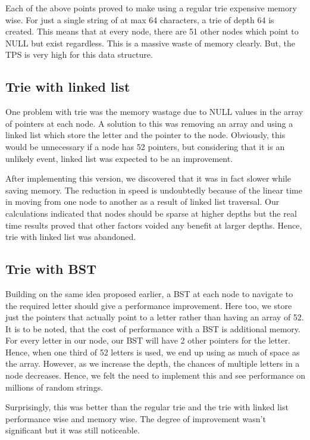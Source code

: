 \documentclass{article}
\begin{document}
Each of the above points proved to make using a regular trie expensive memory wise. For just a single string of at max 64 characters, a trie of depth 64 is created. This means that at every node, there are 51 other nodes which point to NULL but exist regardless. This is a massive waste of memory clearly. But, the TPS is very high for this data structure.

\subsection{Trie with linked list}

One problem with trie was the memory wastage due to NULL values in the array of pointers at each node. A solution to this was removing an array and using a linked list which store the letter and the pointer to the node. Obviously, this would be unnecessary if a node has 52 pointers, but considering that it is an unlikely event, linked list was expected to be an improvement. 

After implementing this version, we discovered that it was in fact slower while saving memory. The reduction in speed is undoubtedly because of the linear time in moving from one node to another as a result of linked list traversal. Our calculations indicated that nodes should be sparse at higher depths but the real time results proved that other factors voided any benefit at larger depths. Hence, trie with linked list was abandoned.

\subsection{Trie with BST}

Building on the same idea proposed earlier, a BST at each node to navigate to the required letter should give a performance improvement. Here too, we store just the pointers that actually point to a letter rather than having an array of 52. It is to be noted, that the cost of performance with a BST is additional memory. For every letter in our node, our BST will have 2 other pointers for the letter. Hence, when one third of 52 letters is used, we end up using as much of space as the array. However, as we increase the depth, the chances of multiple letters in a node decreases. Hence, we felt the need to implement this and see performance on millions of random strings.

Surprisingly, this was better than the regular trie and the trie with linked list performance wise and memory wise. The degree of improvement wasn't significant but it was still noticeable. 
\end{document}
